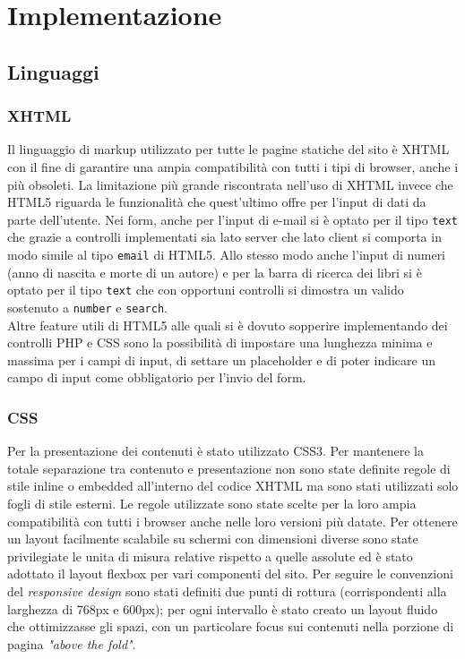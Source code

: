 \documentclass[12pt,a4paper,headings=optiontohead]{article}
\begin{document}
	\section{Implementazione}
	\subsection{Linguaggi}
	\subsubsection{XHTML}
	Il linguaggio di markup utilizzato per tutte le pagine statiche del sito è XHTML con il fine di garantire una ampia compatibilità con tutti i tipi di browser, anche i più obsoleti. La limitazione più grande riscontrata nell'uso di XHTML invece che HTML5 riguarda le funzionalità che quest'ultimo offre per l'input di dati da parte dell'utente. Nei form, anche per l'input di e-mail si è optato per il tipo \texttt{text} che grazie a controlli implementati sia lato server che lato client si comporta in modo simile al tipo \texttt{email} di HTML5. Allo stesso modo anche l'input di numeri (anno di nascita e morte di un autore) e per la barra di ricerca dei libri si è optato per il tipo \texttt{text} che con opportuni controlli si dimostra un valido sostenuto a \texttt{number} e \texttt{search}. \\
	Altre feature utili di HTML5 alle quali si è dovuto sopperire implementando dei controlli PHP e CSS sono la possibilità di impostare una lunghezza minima e massima per i campi di input, di settare un placeholder e di poter indicare un campo di input come obbligatorio per l'invio del form.
	
	\subsubsection{CSS}
	Per la presentazione dei contenuti è stato utilizzato CSS3. Per mantenere la totale separazione tra contenuto e presentazione non sono state definite regole di stile inline o embedded all'interno del codice XHTML ma sono stati utilizzati solo fogli di stile esterni. Le regole utilizzate sono state scelte per la loro ampia compatibilità con tutti i browser anche nelle loro versioni più datate. Per ottenere un layout facilmente scalabile su schermi con dimensioni diverse sono state privilegiate le unita di misura relative rispetto a quelle assolute ed è stato adottato il layout flexbox per vari componenti del sito. Per seguire le convenzioni del \textit{responsive design} sono stati definiti due punti di rottura (corrispondenti alla larghezza di 768px%
	 e 600px); %
	  per ogni intervallo è stato creato un layout fluido che ottimizzasse gli spazi, con un particolare focus sui contenuti nella porzione di pagina \textit{"above the fold"}.
\end{document}
